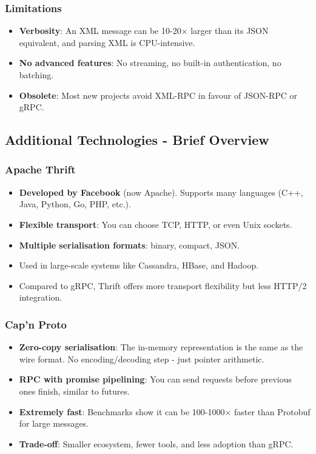 \documentclass[10pt,a4paper]{article}
\begin{document}
\subsubsection{Limitations}
\begin{itemize}
    \item \textbf{Verbosity}: An XML message can be 10-20× larger than its JSON equivalent, and parsing XML is CPU-intensive.
    \item \textbf{No advanced features}: No streaming, no built-in authentication, no batching.
    \item \textbf{Obsolete}: Most new projects avoid XML-RPC in favour of JSON-RPC or gRPC.
\end{itemize}

\subsection{Additional Technologies - Brief Overview}

\subsubsection{Apache Thrift}
\begin{itemize}
    \item \textbf{Developed by Facebook} (now Apache). Supports many languages (C++, Java, Python, Go, PHP, etc.).
    \item \textbf{Flexible transport}: You can choose TCP, HTTP, or even Unix sockets.
    \item \textbf{Multiple serialisation formats}: binary, compact, JSON.
    \item Used in large-scale systems like Cassandra, HBase, and Hadoop.
    \item Compared to gRPC, Thrift offers more transport flexibility but less HTTP/2 integration.
\end{itemize}

\subsubsection{Cap’n Proto}
\begin{itemize}
    \item \textbf{Zero-copy serialisation}: The in-memory representation is the same as the wire format. No encoding/decoding step - just pointer arithmetic.
    \item \textbf{RPC with promise pipelining}: You can send requests before previous ones finish, similar to futures.
    \item \textbf{Extremely fast}: Benchmarks show it can be 100-1000× faster than Protobuf for large messages.
    \item \textbf{Trade-off}: Smaller ecosystem, fewer tools, and less adoption than gRPC.
\end{itemize}
\end{document}

